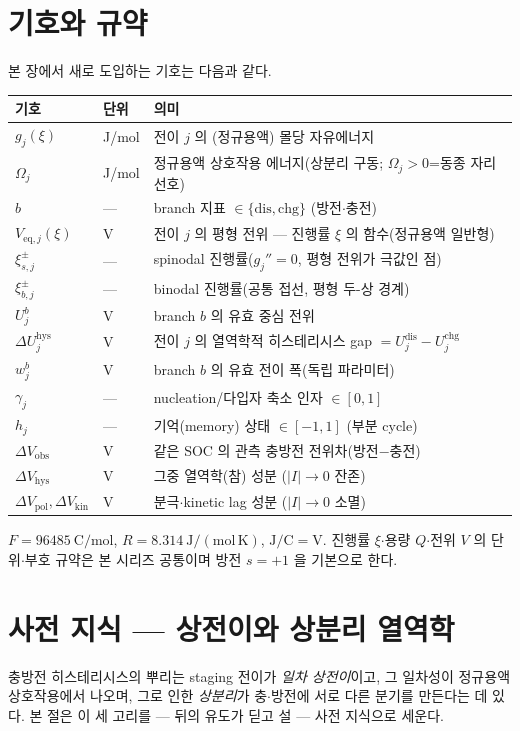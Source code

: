 \documentclass[11pt,a4paper]{article}
\newcommand{\eq}{\mathrm{eq}}
\newcommand{\dis}{\mathrm{dis}}
\newcommand{\chg}{\mathrm{chg}}
\newcommand{\hys}{\mathrm{hys}}
\newcommand{\pol}{\mathrm{pol}}
\newcommand{\kin}{\mathrm{kin}}
\newcommand{\obs}{\mathrm{obs}}
\begin{document}
\section{기호와 규약}\label{sec:hys_notation}
본 장에서 새로 도입하는 기호는 다음과 같다.
\begin{longtable}{p{} p{} >{\raggedright\arraybackslash}p{}}
\toprule 기호 & 단위 & 의미 \\ \midrule \endhead
$g_j(\xi)$ & J/mol & 전이 $j$ 의 (정규용액) 몰당 자유에너지 \\
$\Omega_j$ & J/mol & 정규용액 상호작용 에너지(상분리 구동; $\Omega_j>0$=동종 자리 선호) \\
$b$ & --- & branch 지표 $\in\{\dis,\chg\}$ (방전$\cdot$충전) \\
$V_{\eq,j}(\xi)$ & V & 전이 $j$ 의 평형 전위 — 진행률 $\xi$ 의 함수(정규용액 일반형) \\
$\xi_{s,j}^\pm$ & --- & spinodal 진행률($g_j''=0$, 평형 전위가 극값인 점) \\
$\xi_{b,j}^\pm$ & --- & binodal 진행률(공통 접선, 평형 두-상 경계) \\
$U_j^b$ & V & branch $b$ 의 유효 중심 전위 \\
$\Delta U_j^\hys$ & V & 전이 $j$ 의 열역학적 히스테리시스 gap $=U_j^\dis-U_j^\chg$ \\
$w_j^b$ & V & branch $b$ 의 유효 전이 폭(독립 파라미터) \\
$\gamma_j$ & --- & nucleation/다입자 축소 인자 $\in[0,1]$ \\
$h_j$ & --- & 기억(memory) 상태 $\in[-1,1]$ (부분 cycle) \\
$\Delta V_\obs$ & V & 같은 SOC 의 관측 충방전 전위차(방전$-$충전) \\
$\Delta V_\hys$ & V & 그중 열역학(참) 성분 ($|I|\to0$ 잔존) \\
$\Delta V_\pol,\Delta V_\kin$ & V & 분극$\cdot$kinetic lag 성분 ($|I|\to0$ 소멸) \\
\bottomrule
\end{longtable}
$F=96485\ \mathrm{C/mol}$, $R=8.314\ \mathrm{J/(mol\,K)}$, $\mathrm{J/C}=\mathrm V$. 진행률 $\xi$$\cdot$용량
$Q$$\cdot$전위 $V$ 의 단위$\cdot$부호 규약은 본 시리즈 공통이며 방전 $s=+1$ 을 기본으로 한다.

\section{사전 지식 — 상전이와 상분리 열역학}\label{sec:hys_bg}
충방전 히스테리시스의 뿌리는 staging 전이가 \emph{일차 상전이}이고, 그 일차성이 정규용액 상호작용에서 나오며,
그로 인한 \emph{상분리}가 충$\cdot$방전에 서로 다른 분기를 만든다는 데 있다. 본 절은 이 세 고리를 — 뒤의 유도가
딛고 설 — 사전 지식으로 세운다.
\end{document}
